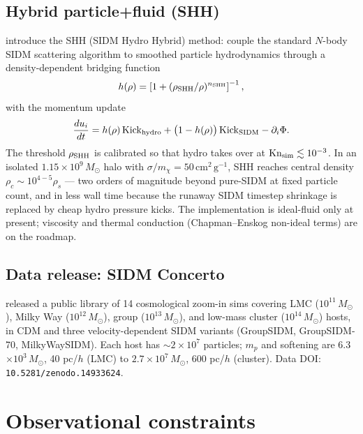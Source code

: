 \documentclass[12pt]{article}
\newcommand{\cmg}{\,\mathrm{cm^2\,g^{-1}}}
\newcommand{\Msun}{\,M_\odot}
\newcommand{\smx}{\sigma/m_\chi}
\newcommand{\Kn}{\mathrm{Kn}}
\begin{document}
\subsection{Hybrid particle+fluid (SHH)}

\citet{Schon2025} introduce the SHH (SIDM Hydro Hybrid) method: couple
the standard $N$-body SIDM scattering algorithm to smoothed particle
hydrodynamics through a density-dependent bridging function
%
\begin{equation}
  h(\rho) = \left[1 + (\rho_{\rm SHH}/\rho)^{n_{\rm SHH}}\right]^{-1},
  \label{eq:SHH_h}
\end{equation}
%
with the momentum update
%
\begin{equation}
  \frac{du_i}{dt}
    = h(\rho)\,{\rm Kick}_{\rm hydro}
    + \bigl(1-h(\rho)\bigr)\,{\rm Kick}_{\rm SIDM}
    - \partial_i\Phi.
  \label{eq:SHH_momentum}
\end{equation}
%
The threshold $\rho_{\rm SHH}$ is calibrated so that hydro takes over
at $\Kn_{\rm sim}\lesssim 10^{-3}$.  In an isolated $1.15\times
10^9\Msun$ halo with $\smx = 50\cmg$, SHH reaches central density
$\rho_c\sim 10^{4-5}\rho_s$ --- two orders of magnitude beyond
pure-SIDM at fixed particle count, and in less wall time because the
runaway SIDM timestep shrinkage is replaced by cheap hydro pressure
kicks.  The implementation is ideal-fluid only at present; viscosity
and thermal conduction (Chapman--Enskog non-ideal terms) are on the
roadmap.

\subsection{Data release: SIDM Concerto}

\citet{Palubski2025} released a public library of 14 cosmological
zoom-in sims covering LMC ($10^{11}\Msun$), Milky Way
($10^{12}\Msun$), group ($10^{13}\Msun$), and low-mass cluster
($10^{14}\Msun$) hosts, in CDM and three velocity-dependent SIDM
variants (GroupSIDM, GroupSIDM-70, MilkyWaySIDM).  Each host has
$\sim 2\times 10^7$ particles;
$m_p$ and softening are 6.3$\times 10^3\Msun$, 40 pc/$h$ (LMC) to
$2.7\times 10^7\Msun$, 600 pc/$h$ (cluster).  Data DOI:
\texttt{10.5281/zenodo.14933624}.

\section{Observational constraints}
\label{sec:constraints}
\end{document}
